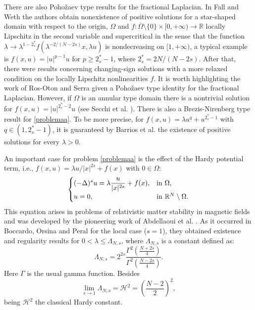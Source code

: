 \documentclass[preprint,12pt]{elsarticle}
\begin{document}
		There are also Poho\v{z}aev type results for the fractional Laplacian. In Fall and Weth \cite{FallWeth} the authors obtain nonexistence of positive solutions for a star-shaped domain with respect to the origin, $\Omega$ and $f: \overline{\Omega}\setminus \{0\} \times [0,+\infty)\rightarrow \mathbb{R}$ locally Lipschitz in the second variable and  supercritical in the sense that  the function $\lambda \rightarrow \lambda^{1-2^*_s}f(\lambda^{-2/(N-2s)}x,\lambda u)$ is nondecreasing on $[1,+\infty)$, a typical example is  $f(x,u)=|u|^{p-1}u$ for $p\geq 2^*_s-1$, where ${2^*_s=2N/(N-2s)}$. After that, there were results concerning changing-sign solutions with a more relaxed condition on the locally Lipschitz nonlinearities $f$. It is worth highlighting the work of Ros-Oton and Serra \cite{Ros} given a Poho\v{z}aev type identity for the fractional Laplacian. However,  if $\Omega$ is an annular type domain there is a nontrivial solution for $f(x,u)=|u|^{2^*_s-2}u$ (see Secchi et al. \cite{Secchi}). There is also a Brezis-Nirenberg type result for \eqref{problemaa}. To be more precise, for
		$f(x,u)=\lambda u^q+u^{2^*_s-1}$ with $q\in (1,2^*_s-1)$, it is guaranteed by Barrios et al. \cite{Barrios2} the existence of positive solutions for every $\lambda >0$.
		
		An important case for problem \eqref{problemaa} is the effect of the Hardy potential term, i.e., $f(x,u)=\lambda u/|x|^{2s}+f(x)$ with $0 \in \Omega$:
		\begin{equation}\label{problema4}
			\begin{cases}
				\displaystyle(-\Delta)^s u = \lambda \frac{u}{|x|^{2s}}+f(x), &  \text{in $\Omega$,}\\
				\mathnormal{u}=0, & \text{in $\mathbb{R}^N\setminus\Omega$.}
			\end{cases}
		\end{equation}  
		This equation arises in problems of relativistic matter stability in magnetic fields and was developed by the pioneering work of Abdellaoui et al. \cite{Ireneo}. As it occurred in Boccardo, Orsina and Peral \cite{Boc} for the local case ($s=1$), they obtained existence and regularity results for $0<\lambda \leq \Lambda_{N,s}$, where $\Lambda_{N,s}$ is a constant defined as:
		\[\Lambda_{N,s}= 2^{2s}\frac{\Gamma^2\left(\frac{N+2s}{4}\right)}{\Gamma^2\left(\frac{N-2s}{4}\right)}.\]
		Here $\Gamma$ is the usual gamma function. Besides 
		$$\lim_{s\rightarrow 1} \Lambda_{N,s}=\mathcal{H}^2=\left(\frac{N-2}{2}\right)^2,$$
		being $\mathcal{H}^2$ the classical Hardy constant.
		
\end{document}
